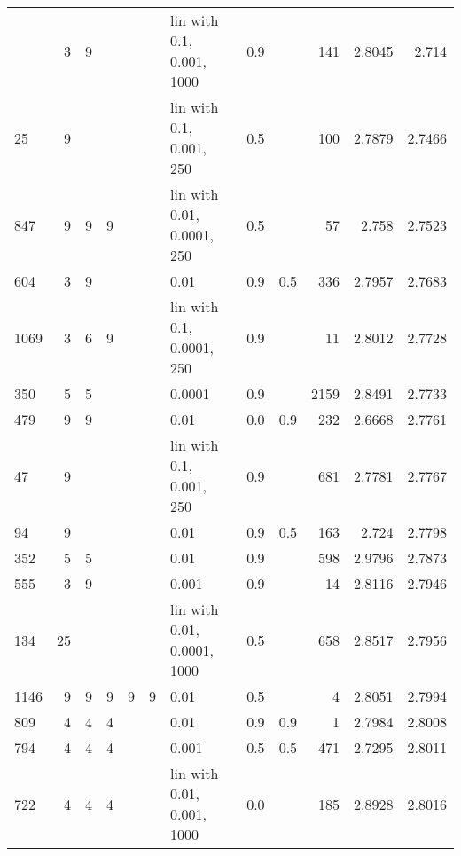 \begin{longtable}{lrrrrrlrrrrr}
\bottomrule
\endlastfoot
  558 &       3 & 9 &   &   &   &   lin with 0.1, 0.001, 1000 &      0.9 &        &     141 &     2.8045 &         2.714 \\
   25 &       9 &   &   &   &   &    lin with 0.1, 0.001, 250 &      0.5 &        &     100 &     2.7879 &        2.7466 \\
  847 &       9 & 9 & 9 &   &   &  lin with 0.01, 0.0001, 250 &      0.5 &        &      57 &      2.758 &        2.7523 \\
  604 &       3 & 9 &   &   &   &                        0.01 &      0.9 &    0.5 &     336 &     2.7957 &        2.7683 \\
 1069 &       3 & 6 & 9 &   &   &   lin with 0.1, 0.0001, 250 &      0.9 &        &      11 &     2.8012 &        2.7728 \\
  350 &       5 & 5 &   &   &   &                      0.0001 &      0.9 &        &    2159 &     2.8491 &        2.7733 \\
  479 &       9 & 9 &   &   &   &                        0.01 &      0.0 &    0.9 &     232 &     2.6668 &        2.7761 \\
   47 &       9 &   &   &   &   &    lin with 0.1, 0.001, 250 &      0.9 &        &     681 &     2.7781 &        2.7767 \\
   94 &       9 &   &   &   &   &                        0.01 &      0.9 &    0.5 &     163 &      2.724 &        2.7798 \\
  352 &       5 & 5 &   &   &   &                        0.01 &      0.9 &        &     598 &     2.9796 &        2.7873 \\
  555 &       3 & 9 &   &   &   &                       0.001 &      0.9 &        &      14 &     2.8116 &        2.7946 \\
  134 &      25 &   &   &   &   & lin with 0.01, 0.0001, 1000 &      0.5 &        &     658 &     2.8517 &        2.7956 \\
 1146 &       9 & 9 & 9 & 9 & 9 &                        0.01 &      0.5 &        &       4 &     2.8051 &        2.7994 \\
  809 &       4 & 4 & 4 &   &   &                        0.01 &      0.9 &    0.9 &       1 &     2.7984 &        2.8008 \\
  794 &       4 & 4 & 4 &   &   &                       0.001 &      0.5 &    0.5 &     471 &     2.7295 &        2.8011 \\
  722 &       4 & 4 & 4 &   &   &  lin with 0.01, 0.001, 1000 &      0.0 &        &     185 &     2.8928 &        2.8016 \\

\end{longtable}
